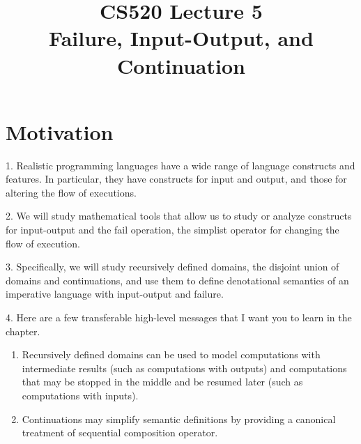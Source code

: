 \documentclass{report}[12pt]
\begin{document}
\setlength\parindent{0pt}

  {\topsep}{\topsep}%
  {\itshape}{}%
  {\bfseries}{}%
  {\newline}{}%

\theoremstyle{break}

\newtheorem{theorem}{Theorem}[section]
\newtheorem{definition}{Definition}
\newtheorem{proposition}{Proposition}
\newtheorem{corollary}{Corollary}
\newtheorem{lemma}{Lemma}
\newtheorem{example}{Example}
\newcommand{\nonterminal}[1]{\langle \text{#1}\rangle}
\newcommand{\rem}[0]{\text{ rem }}
\newcommand{\interp}[1]{\llbracket #1 \rrbracket}
\newcommand{\bbot}[0]{\Perp}
\newcommand{\TODO}[1]{TODO : #1}

\setcounter{chapter}{5}

\title{CS520 Lecture 5\\Failure, Input-Output, and Continuation}
\maketitle

\section{Motivation}
1. Realistic programming languages have a wide range of language constructs and features. In particular, they have constructs for input and output, and those for altering the flow of executions.

2. We will study mathematical tools that allow us to study or analyze constructs for input-output and the fail operation, the simplist operator for changing the flow of execution.

3. Specifically, we will study recursively defined domains, the disjoint union of domains and continuations, and use them to define denotational semantics of an imperative language with input-output and failure.

4. Here are a few transferable high-level messages that I want you to learn in the chapter.
\begin{enumerate}
  \item Recursively defined domains can be used to model computations with intermediate results (such as computations with outputs) and computations that may be stopped in the middle and be resumed later (such as computations with inputs).
  \item Continuations may simplify semantic definitions by providing a canonical treatment of sequential composition operator.
\end{enumerate}
\end{document}

